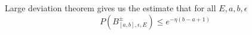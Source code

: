 Large deviation theorem gives us the estimate that for all $E, a, b,\epsilon$
\begin{equation}\label{ldt}
P(B_{[a,b],\epsilon,E}^\pm)\leq e^{-\eta(b-a+1)}
\end{equation}

